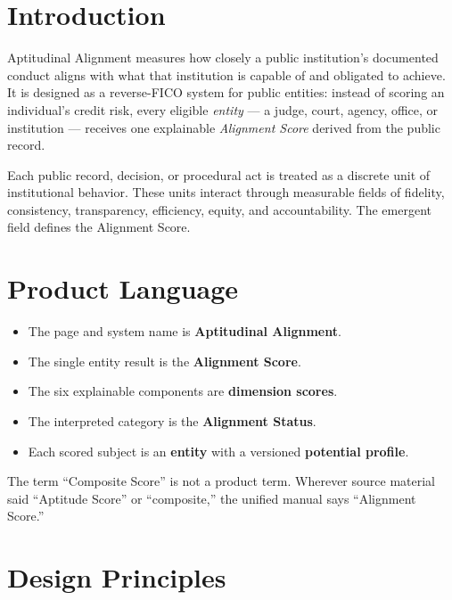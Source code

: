 \section{Introduction}

Aptitudinal Alignment measures how closely a public institution's documented
conduct aligns with what that institution is capable of and obligated to
achieve. It is designed as a reverse-FICO system for public entities: instead
of scoring an individual's credit risk, every eligible \emph{entity} --- a
judge, court, agency, office, or institution --- receives one explainable
\emph{Alignment Score} derived from the public record.

Each public record, decision, or procedural act is treated as a discrete unit
of institutional behavior. These units interact through measurable fields of
fidelity, consistency, transparency, efficiency, equity, and accountability.
The emergent field defines the Alignment Score.

\section{Product Language}

\begin{itemize}
  \item The page and system name is \textbf{Aptitudinal Alignment}.
  \item The single entity result is the \textbf{Alignment Score}.
  \item The six explainable components are \textbf{dimension scores}.
  \item The interpreted category is the \textbf{Alignment Status}.
  \item Each scored subject is an \textbf{entity} with a versioned
        \textbf{potential profile}.
\end{itemize}

The term ``Composite Score'' is not a product term. Wherever source material
said ``Aptitude Score'' or ``composite,'' the unified manual says
``Alignment Score.''

\section{Design Principles}

